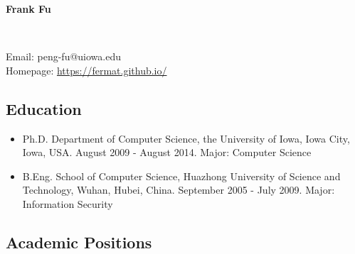 \documentclass{article}
\begin{document}
\begin{center}
{\Large{\bfseries Frank Fu}}

\

Email: peng-fu@uiowa.edu\\
Homepage: \url{https://fermat.github.io/}

\end{center}



\subsection*{Education}

\begin{itemize}
\item Ph.D. Department of Computer Science, the University of Iowa, Iowa City, Iowa, USA. August 2009 - August 2014. Major: Computer Science
  \item B.Eng. School of Computer Science, Huazhong University of Science and Technology, Wuhan, Hubei, China. September 2005 - July 2009. Major: Information Security %
\end{itemize}

\subsection*{Academic Positions}
\end{document}
